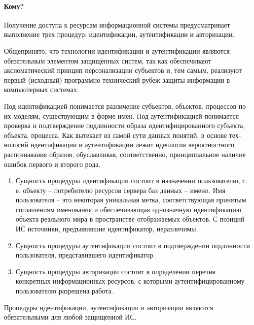 \paragraph{Кому?}

Получение доступа к ресурсам информационной системы предусматривает выполнение трех процедур: идентификации, аутентификации и авторизации.

Общепринято, что технологии идентификации и аутентификации являются обязательным элементом защищенных систем, так как обеспечивают аксиоматический принцип персонализации субъектов и, тем самым, реализуют первый (исходный) программ­но-технический рубеж защиты информации в компьютерных системах.

Под идентификацией понимается различение субъектов, объектов, процессов по их моделям, существующим в форме имен. Под аутентификацией понимается проверка и подтверждение подлинности образа идентифицированного субъекта, объекта, процесса. Как вытекает из самой сути данных понятий, в основе тех­нологий идентификации и аутентификации лежит идеология вероятностного распознавания образов, обуславливая, соответственно, принципиальное наличие ошибок первого и второго рода.
\begin{enumerate}
	\item Сущность процедуры идентификации состоит в назначении пользователю, т. е. объекту -- потребителю ресурсов сервера баз данных -- имени. Имя пользователя -- это некоторая уникальная метка, соответствующая принятым соглашениям именования и обеспечивающая однозначную идентификацию объекта реального мира в пространстве отображаемых объектов. С позиций ИС источники, предъявившие идентификатор, неразличимы.
	\item Сущность процедуры аутентификации состоит в подтверждении подлинности пользователя, представившего идентификатор.
	\item Сущность процедуры авторизации состоит в определении перечня конкретных информационных ресурсов, с которыми аутентифицированному пользователю разрешена работа.

\end{enumerate}
Процедуры идентификации, аутентификации и авторизации являются обязательными для любой защищенной ИС.

